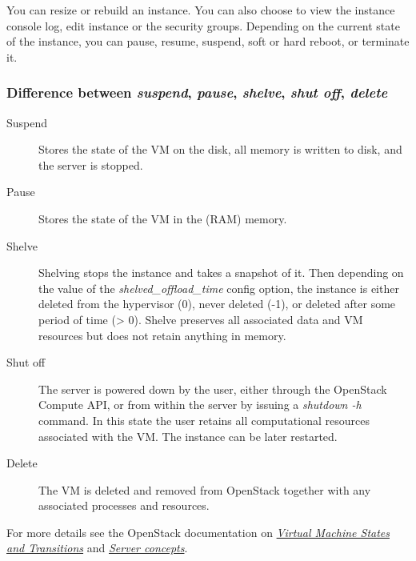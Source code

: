 You can resize or rebuild an instance. You can also choose to view the
instance console log, edit instance or the security groups. Depending on
the current state of the instance, you can pause, resume, suspend, soft
or hard reboot, or terminate it.

\subsubsection{Difference between \emph{suspend}, \emph{pause}, \emph{shelve}, \emph{shut off}, \emph{delete}}\label{server-power-down-states}

\begin{description}
\item[Suspend] Stores the state of the VM on the disk, all memory is written to disk, and the server is stopped.
\item[Pause] Stores the state of the VM in the (RAM) memory.
\item[Shelve] Shelving stops the instance and takes a snapshot of it. Then depending on the value of the \emph{shelved\_offload\_time} config option, the instance is either deleted from the hypervisor (0), never deleted (-1), or deleted after some period of time (> 0). Shelve preserves all associated data and VM resources but does not retain anything in memory.
\item[Shut off] The server is powered down by the user, either through the OpenStack Compute API, or from within the server by issuing a \emph{shutdown -h} command. In this state the user retains all computational resources associated with the VM. The instance can be later restarted.
\item[Delete] The VM is deleted and removed from \gls{OpenStack} together with any associated processes and resources.
\end{description}

For more details see the OpenStack documentation on \href{https://docs.openstack.org/nova/\osversion/reference/vm-states.html}{\emph{Virtual Machine States and Transitions}} and \href{https://developer.openstack.org/api-guide/compute/server_concepts.html}{\emph{Server concepts}}.

